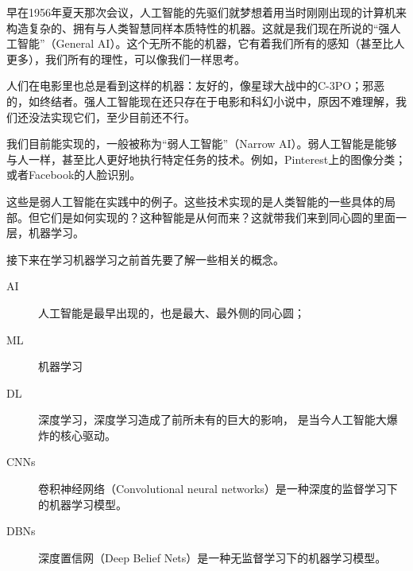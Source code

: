 \documentclass[a4paper,12pt]{ctexbook}
\begin{document}
早在1956年夏天那次会议，人工智能的先驱们就梦想着用当时刚刚出现的计算机来构造复杂的、拥有与人类智慧同样本质特性的机器。这就是我们现在所说的“强人工智能”（General AI）。这个无所不能的机器，它有着我们所有的感知（甚至比人更多），我们所有的理性，可以像我们一样思考。

人们在电影里也总是看到这样的机器：友好的，像星球大战中的C-3PO；邪恶的，如终结者。强人工智能现在还只存在于电影和科幻小说中，原因不难理解，我们还没法实现它们，至少目前还不行。

我们目前能实现的，一般被称为“弱人工智能”（Narrow AI）。弱人工智能是能够与人一样，甚至比人更好地执行特定任务的技术。例如，Pinterest上的图像分类；或者Facebook的人脸识别。

这些是弱人工智能在实践中的例子。这些技术实现的是人类智能的一些具体的局部。但它们是如何实现的？这种智能是从何而来？这就带我们来到同心圆的里面一层，机器学习。

接下来在学习机器学习之前首先要了解一些相关的概念。
\begin{description}
  \item[AI] 人工智能是最早出现的，也是最大、最外侧的同心圆；
  \item[ML] 机器学习
  \item[DL] 深度学习，深度学习造成了前所未有的巨大的影响， 是当今人工智能大爆炸的核心驱动。
  \item[CNNs] 卷积神经网络（Convolutional neural networks）是一种深度的监督学习下的机器学习模型。
  \item[DBNs] 深度置信网（Deep Belief Nets）是一种无监督学习下的机器学习模型。
\end{description}











\end{document}
